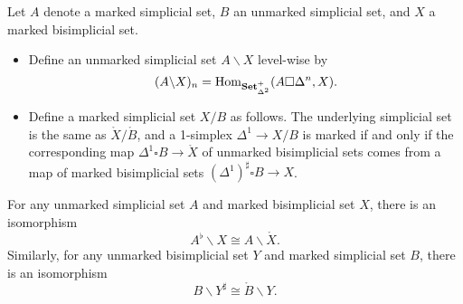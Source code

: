 \documentclass[main.tex]{subfiles}
\begin{document}
\begin{definition}
  Let $A$ denote a marked simplicial set, $B$ an unmarked simplicial set, and $X$ a marked bisimplicial set.
  \begin{itemize}
    \item Define an unmarked simplicial set $A \backslash X$ level-wise by
      \begin{equation*}
        (A \backslash X)_{n} = \mathrm{Hom}_{\mathbf{Set}_{\Delta^{2}}^{+}}(A \square \Delta^{n}, X).
      \end{equation*}

    \item Define a marked simplicial set $X / B$ as follows. The underlying simplicial set is the same as $\mathring{X} / \mathring{B}$, and a 1-simplex $\Delta^{1} \to X / B$ is marked if and only if the corresponding map $\Delta^{1} \square B \to \mathring{X}$ of unmarked bisimplicial sets comes from a map of marked bisimplicial sets $(\Delta^{1})^{\sharp} \square B \to X$.
  \end{itemize}
\end{definition}

\begin{example}
  For any unmarked simplicial set $A$ and marked bisimplicial set $X$, there is an isomorphism
  \begin{equation*}
    A^{\flat} \backslash X \cong A \backslash \mathring{X}.
  \end{equation*}
  Similarly, for any unmarked bisimplicial set $Y$ and marked simplicial set $B$, there is an isomorphism
  \begin{equation*}
    B \backslash Y^{\sharp} \cong \mathring{B} \backslash Y.
  \end{equation*}
\end{example}
\end{document}
